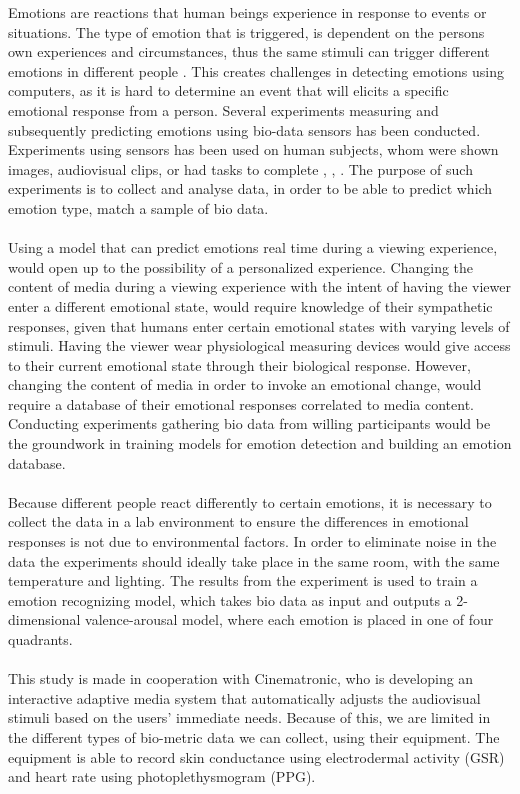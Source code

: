 Emotions are reactions that human beings experience in response to events or situations. The type of emotion that is triggered, is dependent on the persons own experiences and circumstances, thus the same stimuli can trigger different emotions in different people \cite{ekmanEmotions}. This creates challenges in detecting emotions using computers, as it is hard to determine an event that will elicits a specific emotional response from a person. 
Several experiments measuring and subsequently predicting emotions using bio-data sensors has been conducted. Experiments using sensors has been used on human subjects, whom were shown images, audiovisual clips, or had tasks to complete \cite{RecognizingEmotion}, \cite{EmotionSense}, \cite{BioSignalsEmotionModel}. The purpose of such experiments is to collect and analyse data, in order to be able to predict which emotion type, match a sample of bio data.
\\ \\
Using a model that can predict emotions real time during a viewing experience, would open up to the possibility of a personalized experience. Changing the content of media during a viewing experience with the intent of having the viewer enter a different emotional state, would require knowledge of their sympathetic responses, given that humans enter certain emotional states with varying levels of stimuli. Having the viewer wear physiological measuring devices would give access to their current emotional state through their biological response. However, changing the content of media in order to invoke an emotional change, would require a database of their emotional responses correlated to media content. Conducting experiments gathering bio data from willing participants would be the groundwork in training models for emotion detection and building an emotion database. 
\\ \\
Because different people react differently to certain emotions, it is necessary to collect the data in a lab environment to ensure the differences in emotional responses is not due to environmental factors. In order to eliminate noise in the data the experiments should ideally take place in the same room, with the same temperature and lighting. The results from the experiment is used to train a emotion recognizing model, which takes bio data as input and outputs a 2-dimensional valence-arousal model, where each emotion is placed in one of four quadrants.
\\ \\
This study is made in cooperation with Cinematronic, who is developing an interactive adaptive media system that automatically adjusts the audiovisual stimuli based on the users’ immediate needs. Because of this, we are limited in the different types of bio-metric data we can collect, using their equipment. The equipment is able to record skin conductance using electrodermal activity (GSR) and heart rate using photoplethysmogram (PPG).


